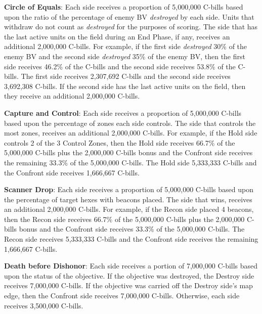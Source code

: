 \begin{description}

\item {\bfseries Circle of Equals}: Each side receives a proportion of 5,000,000 C-bills based upon the ratio of the percentage of enemy BV \emph{destroyed} by each side.
Units that withdraw do not count as \emph{destroyed} for the purposes of scoring.
The side that has the last active units on the field during an End Phase, if any, receives an additional 2,000,000 C-bills.
For example, if the first side \emph{destroyed} 30\% of the enemy BV and the second side \emph{destroyed} 35\% of the enemy BV, then the first side receives 46.2\% of the C-bills and the second side receives 53.8\% of the C-bills.
The first side receives 2,307,692 C-bills and the second side receives 3,692,308 C-bills.
If the second side has the last active units on the field, then they receive an additional 2,000,000 C-bills.

\item {\bfseries Capture and Control}: Each side receives a proportion of 5,000,000 C-bills based upon the percentage of zones each side controls.
The side that controls the most zones, receives an additional 2,000,000 C-bills.
For example, if the Hold side controls 2 of the 3 Control Zones, then the Hold side receives 66.7\% of the 5,000,000 C-bills plus the 2,000,000 C-bills bonus and the Confront side receives the remaining 33.3\% of the 5,000,000 C-bills.
The Hold side 5,333,333 C-bills and the Confront side receives 1,666,667 C-bills.

\item {\bfseries Scanner Drop}: Each side receives a proportion of 5,000,000 C-bills based upon the percentage of target hexes with beacons placed.
The side that wins, receives an additional 2,000,000 C-bills.
For example, if the Recon side placed 4 beacons, then the Recon side receives 66.7\% of the 5,000,000 C-bills plus the 2,000,000 C-bills bonus and the Confront side receives 33.3\% of the 5,000,000 C-bills.
The Recon side receives 5,333,333 C-bills and the Confront side receives the remaining 1,666,667 C-bills.

\item {\bfseries Death before Dishonor}: Each side receives a portion of 7,000,000 C-bills based upon the status of the objective.
If the objective was destroyed, the Destroy side receives 7,000,000 C-bills.
If the objective was carried off the Destroy side's map edge, then the Confront side receives 7,000,000 C-bills.
Otherwise, each side receives 3,500,000 C-bills.


\end{description}
